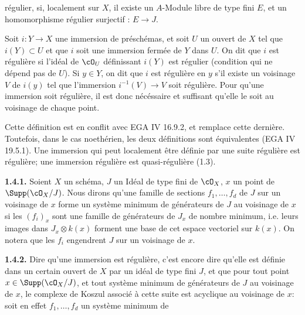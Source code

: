 régulier, si, localement sur $X$, il existe un $A$-Module libre de type fini $E$, et un homomorphisme régulier surjectif : $E\longrightarrow J$.

Soit $i:Y\longrightarrow X$ une immersion de préschémas, et soit $U$ un ouvert de $X$ tel que $i(Y)\subset U$ et que $i$ soit une immersion fermée de $Y$ dans $U$. On dit que $i$ est régulière si l'idéal de $\cO_U$ définissant $i(Y)$ est régulier (condition qui ne dépend pas de $U$). Si $y\in Y$, on dit que $i$ est régulière en $y$ s'il existe un voisinage $V$ de $i(y)$ tel que l'immersion $i^{-1}(V)\longrightarrow V$ soit régulière. Pour qu'une immersion soit régulière, il est donc nécéssaire et suffisant qu'elle le soit au voisinage de chaque point.

Cette définition est en conflit avec EGA IV 16.9.2, et remplace cette dernière. Toutefois, dans le cas noethérien, les deux définitions sont équivalentes (EGA IV 19.5.1). Une immersion qui peut localement être définie par une suite régulière est régulière; une immersion régulière est quasi-régulière (1.3).

\textbf{1.4.1.} Soient $X$ un schéma, $J$ un Idéal de type fini de $\cO_X$, $x$ un point de $\Supp(\cO_X/J)$. Nous dirons qu'une famille de sections $f_1,\ldots,f_d$ de $J$ sur un voisinage de $x$ forme un système minimum de générateurs de $J$ au voisinage de $x$ si les $(f_i)_x$ sont une famille de générateurs de $J_x$ de nombre minimum, i.e. leurs images dans $J_x\otimes k(x)$ forment une base de cet espace vectoriel sur $k(x)$. On notera que les $f_i$ engendrent $J$ sur un voisinage de $x$.

\textbf{1.4.2.} Dire qu'une immersion est régulière, c'est encore dire qu'elle est définie dans un certain ouvert de $X$ par un idéal de type fini $J$, et que pour tout point $x\in\Supp(\cO_X/J)$, et tout système minimum de générateurs de $J$ au voisinage de $x$, le complexe de Koszul associé à cette suite est acyclique au voisinage de $x$: soit en effet $f_1,\ldots,f_d$ un système minimum de
